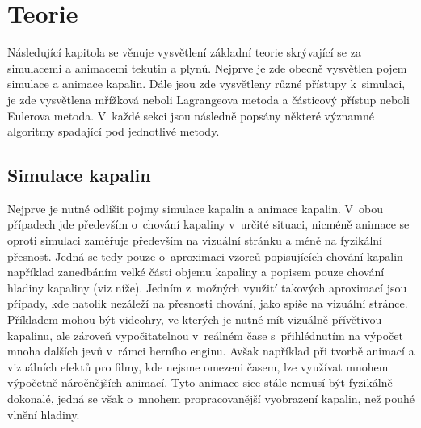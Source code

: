 \chapter{Teorie}
Následující kapitola se věnuje vysvětlení základní teorie skrývající se za simulacemi a animacemi tekutin a plynů. Nejprve je zde obecně vysvětlen pojem simulace a animace kapalin. Dále jsou zde vysvětleny různé přístupy k~simulaci, je zde vysvětlena mřížková neboli Lagrangeova metoda a částicový přístup neboli Eulerova metoda. V~každé sekci jsou následně popsány některé významné algoritmy spadající pod jednotlivé metody.

\label{chapter:teorie}
\section{Simulace kapalin}
Nejprve je nutné odlišit pojmy simulace kapalin a animace kapalin. V~obou případech jde především o~chování kapaliny v~určité situaci, nicméně animace se oproti simulaci zaměřuje především na vizuální stránku a méně na fyzikální přesnost. Jedná se tedy pouze o~aproximaci vzorců popisujících chování kapalin například zanedbáním velké části objemu kapaliny a popisem pouze chování hladiny kapaliny (viz níže). Jedním z~možných využití takových aproximací jsou případy, kde natolik nezáleží na přesnosti chování, jako spíše na vizuální stránce. Příkladem mohou být videohry, ve kterých je nutné mít vizuálně přívětivou kapalinu, ale zároveň vypočitatelnou v~reálném čase s~přihlédnutím na výpočet mnoha dalších jevů v~rámci herního enginu. Avšak například při tvorbě animací a vizuálních efektů pro filmy, kde nejsme omezeni časem, lze využívat mnohem výpočetně náročnějších animací. Tyto animace sice stále nemusí být fyzikálně dokonalé, jedná se však o~mnohem propracovanější vyobrazení kapalin, než pouhé vlnění hladiny. \cite{Medvecky-Heretik2018thesis}

